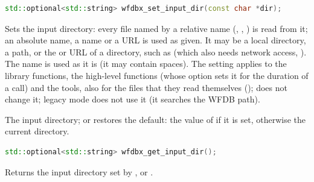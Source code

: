 \begin{lstlisting}[language=C++,style=signature]
std::optional<std::string> wfdbx_set_input_dir(const char *dir);
\end{lstlisting}
Sets the input directory: every file named by a relative name (,
, ) is read from it; an absolute name, a
\code{\textasciitilde} name or a URL is used as given. It may be a local
directory, a \code{\textasciitilde} path, or the  or
 URL of a directory, such as
 (which also needs network
access, ). The name is used as it is (it may contain
spaces). The setting applies to the library functions, the high-level
functions (whose  option sets it for the duration of a call)
and the tools, also for the files that they read themselves
();  does not change it; legacy mode
does not use it (it searches the WFDB path).
\begin{params}
\item[dir] The input directory;  or  restores the
  default: the value of  if it is set, otherwise the
  current directory.
\end{params}

\begin{lstlisting}[language=C++,style=signature]
std::optional<std::string> wfdbx_get_input_dir();
\end{lstlisting}
Returns the input directory set by ,
 or .

